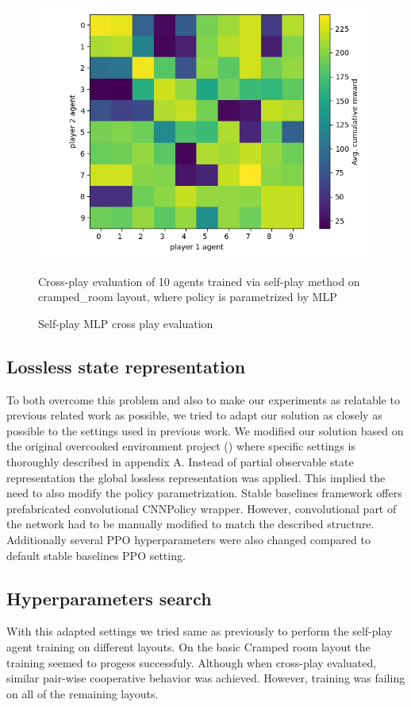 \begin{figure}[!ht]
    \centering
    \includegraphics*[width=13cm]{../img/MLP_OFF_DIAG_TEST.png}
    \caption{Self-play MLP cross play evaluation}
    \label{MLPSPCrossPlay}
    \medskip
    \small 
    Cross-play evaluation of 10 agents trained via self-play method on cramped\_room layout, where policy is parametrized by MLP

\end{figure}

\subsection*{Lossless state representation}
To both overcome this problem and also to make our experiments as relatable to previous related work as possible, we tried to adapt our solution as closely as possible to the settings used in previous work.
We modified our solution based on the original overcooked environment project (\cite{carroll2020utility}) where specific settings is thoroughly described in appendix A.
Instead of partial observable state representation the global lossless representation was applied.
This implied the need to also modify the policy parametrization.
Stable baselines framework offers prefabricated convolutional CNNPolicy wrapper.
However, convolutional part of the network had to be manually modified to match the described structure.
Additionally several PPO hyperparameters were also changed compared to default stable baselines PPO setting.


\subsection*{Hyperparameters search}
With this adapted settings we tried same as previously to perform the self-play agent training on different layouts.
On the basic Cramped room layout the training seemed to progess successfuly.
Although when cross-play evaluated, similar pair-wise cooperative behavior was achieved.
However, training was failing on all of the remaining layouts.

